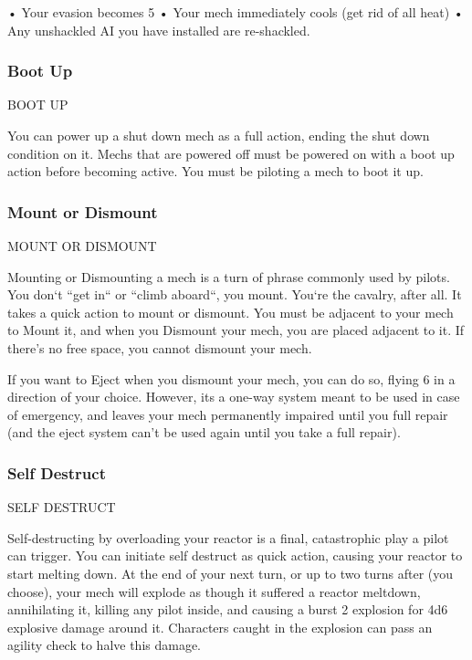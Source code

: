        •  Your evasion becomes 5
       •  Your mech immediately cools (get rid of all heat)
       • Any unshackled AI you have installed are re-shackled.

\subsubsection{Boot Up}
                                              BOOT UP

You can power up a shut down mech as a full action, ending the shut down condition on it.
Mechs that are powered off must be powered on with a boot up action before becoming active.
You must be piloting a mech to boot it up.

\subsubsection{Mount or Dismount}
                                     MOUNT OR DISMOUNT

Mounting or Dismounting a mech is a turn of phrase commonly used by pilots. You don‘t “get
in“ or “climb aboard“, you mount. You‘re the cavalry, after all. It takes a quick action to mount or
dismount. You must be adjacent to your mech to Mount it, and when you Dismount your mech,
you are placed adjacent to it. If there’s no free space, you cannot dismount your mech.


If you want to Eject when you dismount your mech, you can do so, flying 6 in a direction of your
choice. However, its a one-way system meant to be used in case of emergency, and leaves your
mech permanently impaired until you full repair (and the eject system can’t be used again until
you take a full repair).

\subsubsection{Self Destruct}
                                          SELF DESTRUCT

Self-destructing by overloading your reactor is a final, catastrophic play a pilot can trigger. You
can initiate self destruct as quick action, causing your reactor to start melting down. At the end
of your next turn, or up to two turns after (you choose), your mech will explode as though it
suffered a reactor meltdown, annihilating it, killing any pilot inside, and causing a burst 2
explosion for 4d6 explosive damage around it. Characters caught in the explosion can pass an
agility check to halve this damage.

